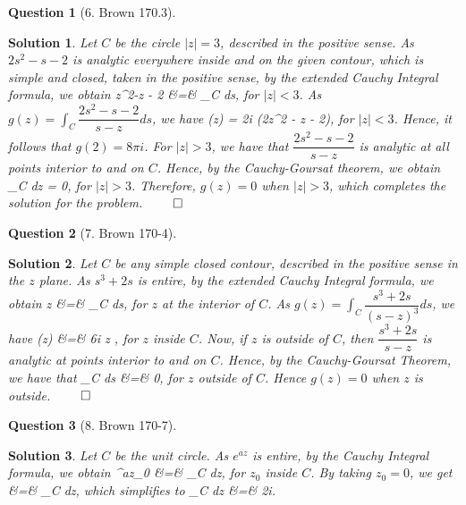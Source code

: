 \documentclass{article} %
\def\eQb#1\eQe{\begin{eqnarray*}#1\end{eqnarray*}}
\theoremstyle{quest}
\newtheorem*{question}{Question}
\newtheorem*{solution}{Solution}
\begin{document}
\bigskip

\begin{question}[6. Brown 170.3]
\end{question}
\begin{solution}
Let $C$ be the circle $|z| = 3$, described in the positive sense.
As $2s^2 - s - 2$ is analytic everywhere inside and on the given contour,
which is simple and closed, taken in the positive sense, by the 
extended Cauchy Integral formula, we obtain 
\eQb
2z^2-z - 2 &=&  \int_{C}  ds,
\eQe 
for $|z| < 3$. As $g(z) = \int_{C} \dfrac{2s^2 - s - 2}{s-z} ds$, we have
\eQb
g(z) = 2\pi i (2z^2 - z - 2),
\eQe 
for $|z| < 3$. Hence, it follows that $g(2) = 8\pi i$. For $|z| > 3$,
we have that $\dfrac{2s^2 - s -2 }{s - z}$ is analytic at all points 
interior to and on $C$. Hence, by the Cauchy-Goursat theorem, we obtain
\eQb
\int_{C}  dz = 0,
\eQe 
for $|z| > 3$. Therefore, $g(z) = 0$ when $|z| > 3$,
which completes the solution for the problem. $\qed$
\end{solution}

\bigskip

\begin{question}[7. Brown 170-4]
\end{question}
\begin{solution}
Let $C$ be any simple closed contour, described in the positive sense
in the $z$ plane. As $s^3 + 2s$ is entire, by the extended Cauchy Integral
formula, we obtain
\eQb
6z &=&  \int_{C}  ds,
\eQe
for $z$ at the interior of $C$. 
As $g(z) = \int_{C} \dfrac{s^3 +2s}{(s-z)^3} ds$, we have 
\eQb
g(z) &=& 6\pi i z ,
\eQe
for $z$ inside $C$. 
Now, if $z$ is outside of $C$, then $\dfrac{s^3 + 2s}
{s-z}$ is analytic at points interior to and on $C$. Hence, by
the Cauchy-Goursat Theorem, we have that
\eQb
\int_{C}  ds &=& 0,
\eQe
for $z$ outside of $C$. 
Hence $g(z) = 0$ when $z$ is outside. $\qed$
\end{solution}

\bigskip
\begin{question}[8. Brown 170-7]
\end{question}
\begin{solution}
Let $C$ be the unit circle. As $e^{az}$ is entire, by the Cauchy Integral
formula, we obtain
\eQb
e^{az_0} &=&  \int_{C}  dz, 
\eQe
for $z_0$ inside $C$. By taking $z_0 = 0$, we get
\eQb
1 &=&  \int_{C}  dz,
\eQe
which simplifies to 
\eQb
\int_{C}  dz &=& 2\pi i. 
\eQe
\end{solution}
\end{document}
